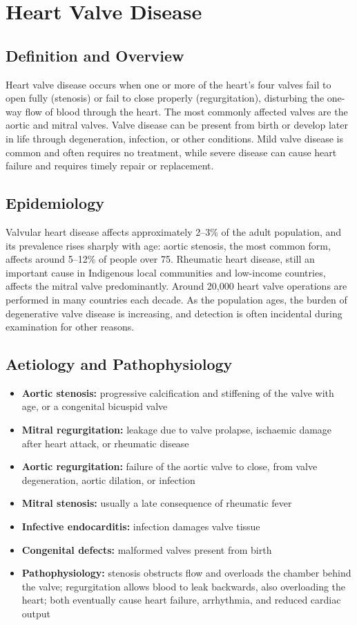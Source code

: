 \chapter{Heart Valve Disease}

\section*{Definition and Overview}
Heart valve disease occurs when one or more of the heart's four valves fail to open fully (stenosis) or fail to close properly (regurgitation), disturbing the one-way flow of blood through the heart. The most commonly affected valves are the aortic and mitral valves. Valve disease can be present from birth or develop later in life through degeneration, infection, or other conditions. Mild valve disease is common and often requires no treatment, while severe disease can cause heart failure and requires timely repair or replacement.

\section*{Epidemiology}
Valvular heart disease affects approximately 2--3\% of the adult population, and its prevalence rises sharply with age: aortic stenosis, the most common form, affects around 5--12\% of people over 75. Rheumatic heart disease, still an important cause in Indigenous local communities and low-income countries, affects the mitral valve predominantly. Around 20,000 heart valve operations are performed in many countries each decade. As the population ages, the burden of degenerative valve disease is increasing, and detection is often incidental during examination for other reasons.

\section*{Aetiology and Pathophysiology}
\begin{itemize}
    \item \textbf{Aortic stenosis:} progressive calcification and stiffening of the valve with age, or a congenital bicuspid valve
    \item \textbf{Mitral regurgitation:} leakage due to valve prolapse, ischaemic damage after heart attack, or rheumatic disease
    \item \textbf{Aortic regurgitation:} failure of the aortic valve to close, from valve degeneration, aortic dilation, or infection
    \item \textbf{Mitral stenosis:} usually a late consequence of rheumatic fever
    \item \textbf{Infective endocarditis:} infection damages valve tissue
    \item \textbf{Congenital defects:} malformed valves present from birth
    \item \textbf{Pathophysiology:} stenosis obstructs flow and overloads the chamber behind the valve; regurgitation allows blood to leak backwards, also overloading the heart; both eventually cause heart failure, arrhythmia, and reduced cardiac output
\end{itemize}

